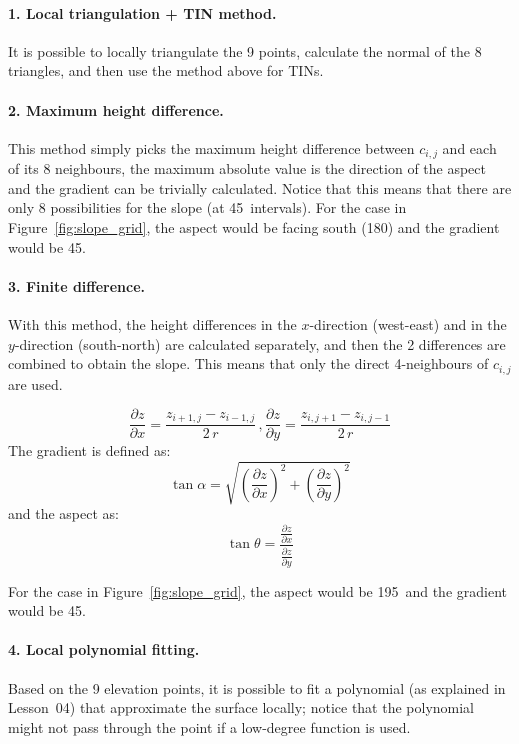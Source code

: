 \paragraph{1. Local triangulation + TIN method.}
It is possible to locally triangulate the 9 points, calculate the normal of the 8 triangles, and then use the method above for TINs.


\paragraph{2. Maximum height difference.}
This method simply picks the maximum height difference between $c_{i,j}$ and each of its 8 neighbours, the maximum absolute value is the direction of the aspect and the gradient can be trivially calculated.
Notice that this means that there are only 8 possibilities for the slope (at 45\degree\ intervals).
For the case in Figure~\ref{fig:slope_grid}, the aspect would be facing south (180\degree) and the gradient would be 45\degree.


\paragraph{3. Finite difference.}

With this method, the height differences in the $x$-direction (west-east) and in the $y$-direction (south-north) are calculated separately, and then the 2 differences are combined to obtain the slope.
This means that only the direct 4-neighbours of $c_{i,j}$ are used.

\[
  \frac{\partial z}{\partial x} = \frac{z_{i+1,j} - z_{i-1,j}}{2\,r}
\, , 
  \frac{\partial z}{\partial y} = \frac{z_{i,j+1} - z_{i,j-1}}{2\,r}
\]
The gradient is defined as:
\[
  \tan \alpha = \sqrt{(\frac{\partial z}{\partial x})^2 + (\frac{\partial z}{\partial y})^2}
\]
and the aspect as:
\[
  \tan \theta = \frac{\frac{\partial z}{\partial x}}{\frac{\partial z}{\partial y}}
\]

For the case in Figure~\ref{fig:slope_grid}, the aspect would be 195\degree\ and the gradient would be 45\degree.


\paragraph{4. Local polynomial fitting.}
\label{sec:polynomial}

Based on the 9 elevation points, it is possible to fit a polynomial (as explained in Lesson~04) that approximate the surface locally; notice that the polynomial might not pass through the point if a low-degree function is used.

